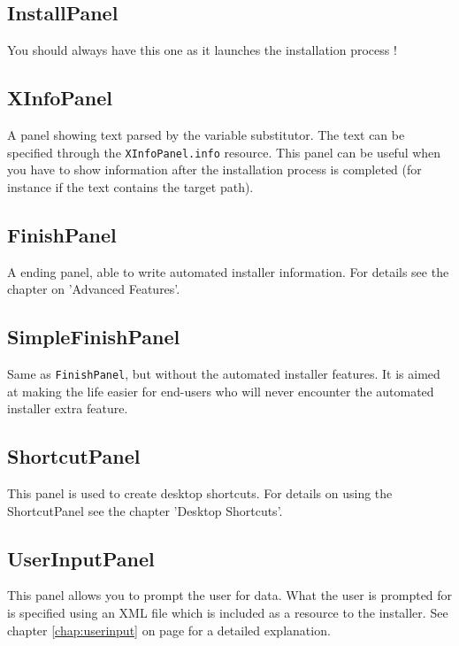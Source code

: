 \subsection{InstallPanel}

You should always have this one as it launches the installation process !\\

\subsection{XInfoPanel}

A panel showing text parsed by the variable substitutor. The text can be
specified through the \texttt{XInfoPanel.info} resource. This panel can
be useful when you have to show information after the installation
process is completed (for instance if the text contains the target
path).\\

\subsection{FinishPanel}

A ending panel, able to write automated installer information. For
details see the chapter on 'Advanced Features'.\\ 

\subsection{SimpleFinishPanel}

Same as \texttt{FinishPanel}, but without the automated installer features. It
is aimed at making the life easier for end-users who will never encounter the
automated installer extra feature.\\

\subsection{ShortcutPanel}

This panel is used to create desktop shortcuts. For details on using the
ShortcutPanel see the chapter 'Desktop Shortcuts'.

\subsection{UserInputPanel}

This panel allows you to prompt the user for data. What the user is prompted
for is specified using an XML file which is included as a resource to the
installer. See chapter \ref{chap:userinput} on page \pageref{chap:userinput}
for a detailed explanation.

